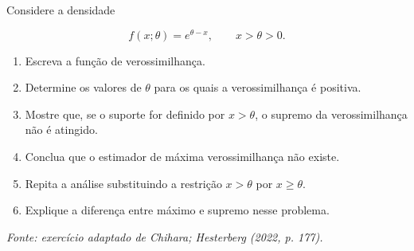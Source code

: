 \documentclass[
  letterpaper,
  DIV=11,
  numbers=noendperiod]{scrreprt}
\providecommand{\tightlist}{%
  \setlength{\itemsep}{0pt}\setlength{\parskip}{0pt}}\usepackage{longtable,booktabs,array}
\begin{document}
\begin{tcolorbox}[enhanced jigsaw, colback=white, leftrule=.75mm, colbacktitle=quarto-callout-tip-color!10!white, breakable, titlerule=0mm, bottomtitle=1mm, title=\textcolor{quarto-callout-tip-color}{\faLightbulb}\hspace{0.5em}{Exercício 7 --- Existência do estimador}, colframe=quarto-callout-tip-color-frame, toprule=.15mm, opacityback=0, bottomrule=.15mm, opacitybacktitle=0.6, arc=.35mm, toptitle=1mm, rightrule=.15mm, coltitle=black, left=2mm]

Considere a densidade

\[f(x;\theta)
=
e^{\theta-x},
\qquad x>\theta>0.\]

\begin{enumerate}
\def\labelenumi{\arabic{enumi}.}
\tightlist
\item
  Escreva a função de verossimilhança.
\item
  Determine os valores de \(\theta\) para os quais a verossimilhança é
  positiva.
\item
  Mostre que, se o suporte for definido por \(x>\theta\), o supremo da
  verossimilhança não é atingido.
\item
  Conclua que o estimador de máxima verossimilhança não existe.
\item
  Repita a análise substituindo a restrição \(x>\theta\) por
  \(x\geq\theta\).
\item
  Explique a diferença entre máximo e supremo nesse problema.
\end{enumerate}

\emph{Fonte: exercício adaptado de Chihara; Hesterberg (2022, p. 177).}

\end{tcolorbox}
\end{document}
